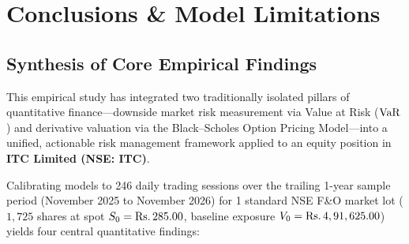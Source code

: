 
\chapter{Conclusions \& Model Limitations}
\label{ch:conclusions}

\section{Synthesis of Core Empirical Findings}
\label{sec:findings_synthesis}

This empirical study has integrated two traditionally isolated pillars of quantitative finance---downside market risk measurement via Value at Risk ($\operatorname{VaR}$) and derivative valuation via the Black--Scholes Option Pricing Model---into a unified, actionable risk management framework applied to an equity position in \textbf{ITC Limited (NSE: ITC)}. 

Calibrating models to 246 daily trading sessions over the trailing 1-year sample period (November 2025 to November 2026) for 1 standard NSE F\&O market lot ($1,725$ shares at spot $S_0 = \text{\text{Rs.}\,}285.00$, baseline exposure $V_0 = \text{\text{Rs.}\,}4,91,625.00$) yields four central quantitative findings:

